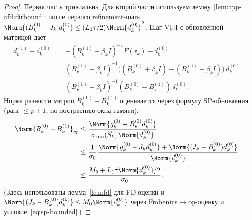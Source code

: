 \begin{proof}
Первая часть тривиальна. Для второй части используем
лемму~\ref{lem:app-afd:dirbound}: после первого refinement-шага
$\Norm{(B_k^{(1)} - J_k) d^{(0)}_k} \le (L_1\tau/2)\Norm{d^{(0)}_k}^{2}$.
Шаг VIJI с обновлённой матрицей даёт
\begin{align*}
d^{(1)}_k - d^{(0)}_k
&= -(B_k^{(1)} + \beta_k I)^{-1} F(v_k) - d^{(0)}_k \\
&= (B_k^{(1)} + \beta_k I)^{-1}\bigl((B_k^{(0)} + \beta_k I) - (B_k^{(1)} + \beta_k I)\bigr)\,d^{(0)}_k \\
&= (B_k^{(1)} + \beta_k I)^{-1}(B_k^{(0)} - B_k^{(1)})\,d^{(0)}_k.
\end{align*}
Норма разности матриц $B_k^{(0)} - B_k^{(1)}$ оценивается через
формулу SP-обновления (ранг $\le p+1$, по построению окна памяти):
\begin{align*}
\Norm{B_k^{(0)} - B_k^{(1)}}_{op}
&\le \frac{\Norm{g^{(0)}_k - B_k^{(0)} d^{(0)}_k}}{\sigma_{\min}(\widehat S_k)\,\Norm{d^{(0)}_k}} \\
&\le \frac{1}{\sigma_0}\,\frac{\Norm{g^{(0)}_k - J_k d^{(0)}_k} + \Norm{(J_k - B_k^{(0)})d^{(0)}_k}}{\Norm{d^{(0)}_k}} \\
&\le \frac{M_0 + L_1\tau\Norm{d^{(0)}_k}/2}{\sigma_0}.
\end{align*}
(Здесь использованы лемма~\ref{lem:fd} для FD-оценки и
$\Norm{(J_k - B_k^{(0)})d^{(0)}_k} \le M_0\Norm{d^{(0)}_k}$ через
Frobenius$\to$op-оценку и условие~\eqref{eq:sp-bounded}.)


\end{proof}
